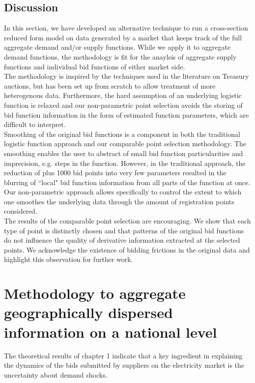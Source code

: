 \subsection{Discussion}
\label{pointccl}
In this section, we have developed an alternative technique to run a cross-section reduced form model on data generated by a market that keeps track of the full aggregate demand and/or supply functions. While we apply it to aggregate demand functions, the methodology is fit for the anaylsis of aggregate supply functions and individual bid functions of either market side.  \\

The methodology is inspired by the techniques used in the literature on Treasury auctions, but has been set up from scratch to allow treatment of more heterogenous data. Furthermore, the hard assumption of an underlying logistic function is relaxed and our non-parametric point selection avoids the storing of bid function information in the form of estimated function parameters, which are difficult to interpret. \\

Smoothing of the original bid functions is a component in both the traditional logistic function approach and our comparable point selection methodology. The smoothing enables the user to abstract of small bid function particularities and imprecision, e.g. steps in the function. However, in the traditional approach, the reduction of plus 1000 bid points into very few parameters resulted in the blurring of ``local" bid function information from all parts of the function at once. Our non-parametric approach allows specifically to control the extent to which one smoothes the underlying data through the amount of registration points considered.\\

The results of the comparable point selection are encouraging. We show that each type of point is distinctly chosen and that patterns of the original bid functions do not influence the quality of derivative information extracted at the selected points. We acknowledge the existence of bidding frictions in the original data and highlight this observation for further work. \\

\section{Methodology to aggregate geographically dispersed information on a national level}
The theoretical results of chapter 1 indicate that a key ingredient in explaining the dynamics of the bids submitted by suppliers on the electricity market is the uncertainty about demand shocks. \\

